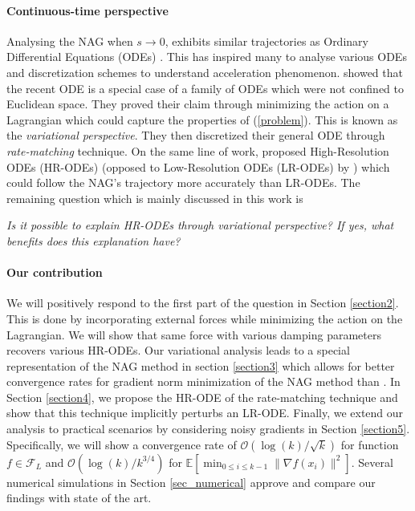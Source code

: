 \documentclass{article}
\theoremstyle{plain}
\theoremstyle{definition}
\theoremstyle{remark}
\begin{document}
\paragraph{Continuous-time perspective}Analysing the NAG when \(s\rightarrow 0\), exhibits similar trajectories as Ordinary Differential Equations (ODEs) \citep{JMLR:v17:15-084}. This has inspired many to analyse various ODEs and discretization schemes to understand acceleration phenomenon. \citep{WibisonoE7351,wilson2021lyapunov} showed that the recent ODE is a special case of a family of ODEs which were not confined to Euclidean space. They proved their claim through minimizing the action on a Lagrangian which could capture the properties of (\ref{problem}). This is known as the \textit{variational perspective}. They then discretized their general ODE through \textit{rate-matching} technique. On the same line of work, \citep{Shi2021UnderstandingTA} proposed High-Resolution ODEs (HR-ODEs) (opposed to Low-Resolution ODEs (LR-ODEs) by \citep{JMLR:v17:15-084}) which could follow the NAG's trajectory more accurately than LR-ODEs. The remaining question which is mainly discussed in this work is
\begin{center}
   \textit{Is it possible to explain HR-ODEs through variational perspective? If yes, what benefits does this explanation have?} 
\end{center}
\paragraph{Our contribution} We will positively respond to the first part of the question in Section \ref{section2}. This is done by incorporating external forces while minimizing the action on the Lagrangian. We will show that same force with various damping parameters recovers various HR-ODEs. Our variational analysis leads to a special representation of the NAG method in section \ref{section3} which allows for better convergence rates for gradient norm minimization of the NAG method than \citep{shi2019acceleration}. In Section \ref{section4}, we propose the HR-ODE of the rate-matching technique and show that this technique implicitly perturbs an LR-ODE. Finally, we extend our analysis to practical scenarios by considering noisy gradients in Section \ref{section5}. Specifically, we will show a convergence rate of \(\mathcal O(\log(k)/\sqrt{k})\) for function \(f\in\mathcal{F}_L\) and \(\mathcal{O}(\log(k)/k^{3/4})\) for \(\mathbb E\left[\min_{0\leq i\leq k-1}\|\nabla f(x_i)\|^2 \right]\). Several numerical simulations in Section \ref{sec_numerical} approve and compare our findings with state of the art.
\end{document}
